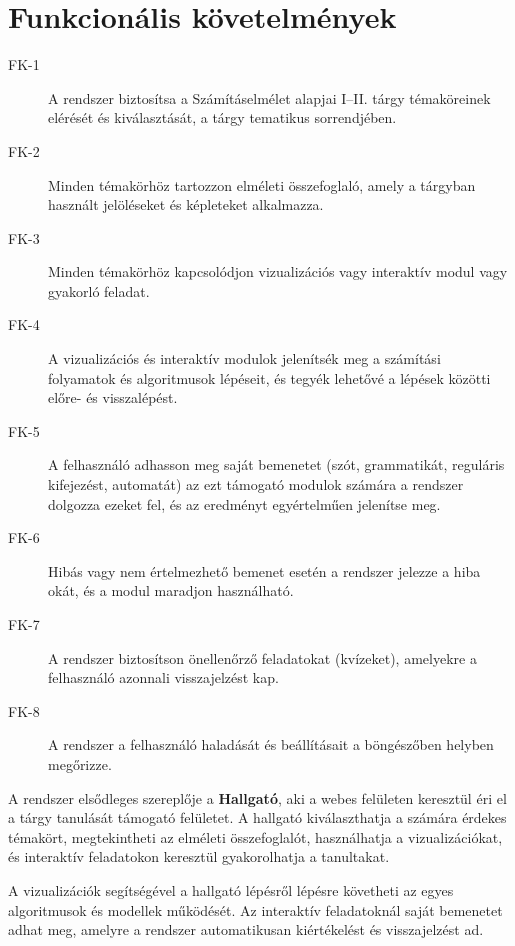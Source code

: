 \documentclass[12pt,a4paper]{report}
\begin{document}
\section{Funkcionális követelmények}
\begin{description}
    \item[FK-1] A rendszer biztosítsa a Számításelmélet alapjai I--II.
          tárgy témaköreinek elérését és kiválasztását, a tárgy
          tematikus sorrendjében.
    \item[FK-2] Minden témakörhöz tartozzon elméleti összefoglaló, amely
          a tárgyban használt jelöléseket és képleteket alkalmazza.
    \item[FK-3] Minden témakörhöz kapcsolódjon vizualizációs vagy
          interaktív modul vagy gyakorló feladat.
    \item[FK-4] A vizualizációs és interaktív modulok jelenítsék meg a
          számítási folyamatok és algoritmusok lépéseit, és tegyék
          lehetővé a lépések közötti előre- és visszalépést.
    \item[FK-5] A felhasználó adhasson meg saját bemenetet (szót,
          grammatikát, reguláris kifejezést, automatát) az ezt támogató
          modulok számára a rendszer dolgozza ezeket fel, és az eredményt
          egyértelműen jelenítse meg.
    \item[FK-6] Hibás vagy nem értelmezhető bemenet esetén a rendszer
          jelezze a hiba okát, és a modul maradjon használható.
    \item[FK-7] A rendszer biztosítson önellenőrző feladatokat (kvízeket),
          amelyekre a felhasználó azonnali visszajelzést kap.
    \item[FK-8] A rendszer a felhasználó haladását és beállításait a
          böngészőben helyben megőrizze.
\end{description}


A rendszer elsődleges szereplője a \textbf{Hallgató}, aki a webes
felületen keresztül éri el a tárgy tanulását támogató felületet. A
hallgató kiválaszthatja a számára érdekes témakört, megtekintheti az
elméleti összefoglalót, használhatja a vizualizációkat, és interaktív
feladatokon keresztül gyakorolhatja a tanultakat.

A vizualizációk segítségével a hallgató lépésről lépésre követheti az
egyes algoritmusok és modellek működését. Az interaktív feladatoknál
saját bemenetet adhat meg, amelyre a rendszer automatikusan
kiértékelést és visszajelzést ad.
\end{document}
